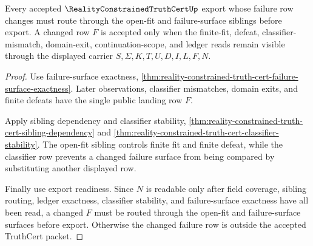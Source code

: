 \begin{theorem}
\label{thm:reality-constrained-truth-cert-open-fit-export-boundary}
Every accepted $\RealityConstrainedTruthCertUp$ export whose failure row changes must route through the open-fit and failure-surface siblings before export. A changed row $F$ is accepted only when the finite-fit, defeat, classifier-mismatch, domain-exit, continuation-scope, and ledger reads remain visible through the displayed carrier $S,\Sigma,K,T,U,D,I,L,F,N$.
\end{theorem}
\begin{proof}
Use failure-surface exactness, \autoref{thm:reality-constrained-truth-cert-failure-surface-exactness}. Later observations, classifier mismatches, domain exits, and finite defeats have the single public landing row $F$.

Apply sibling dependency and classifier stability, \autoref{thm:reality-constrained-truth-cert-sibling-dependency} and \autoref{thm:reality-constrained-truth-cert-classifier-stability}. The open-fit sibling controls finite fit and finite defeat, while the classifier row prevents a changed failure surface from being compared by substituting another displayed row.

Finally use export readiness. Since $N$ is readable only after field coverage, sibling routing, ledger exactness, classifier stability, and failure-surface exactness have all been read, a changed $F$ must be routed through the open-fit and failure-surface surfaces before export. Otherwise the changed failure row is outside the accepted TruthCert packet.
\end{proof}



